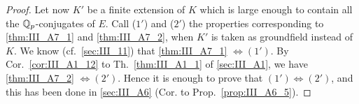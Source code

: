 \begin{subappendices}
\begin{proof}
	Let now $K'$ be a finite extension of $K$ which is large enough to
	contain all the $\mathbb{Q}_p$-conjugates of $E$. Call ($1'$) and ($2'$) the
	properties corresponding to \ref{thm:III_A7_1} and \ref{thm:III_A7_2},
	when $K'$ is taken as groundfield instead of $K$. We know (cf.\
	\ref{sec:III_11}) that \ref{thm:III_A7_1} ${}\iff (1')$. By
	Cor.~\ref{cor:III_A1_12} to Th.~\ref{thm:III_A1_1} of \ref{sec:III_A1},
	we have \ref{thm:III_A7_2} $\iff (2')$. Hence it is enough to prove
	that $(1') \iff (2')$, and this has been done in \ref{sec:III_A6} (Cor.
	to Prop.~\ref{prop:III_A6_5}).
\end{proof}

\end{subappendices}
